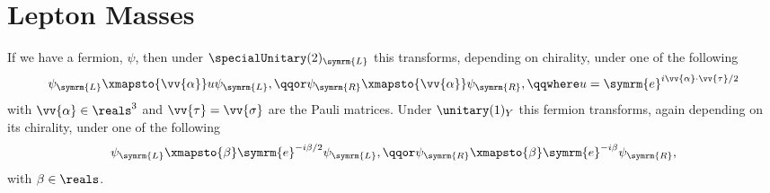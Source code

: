 \documentclass[fleqn]{NotesClass}
\newcommand{\e}{\symrm{e}}
\newcommand{\Left}{\symrm{L}}
\newcommand{\Right}{\symrm{R}}
\begin{document}
    \section{Lepton Masses}
    If we have a fermion, \(\psi\), then under \(\specialUnitary(2)_{\Left}\) this transforms, depending on chirality, under one of the following
    \begin{equation}
        \psi_{\Left} \xmapsto{\vv{\alpha}} u\psi_{\Left}, \qqor \psi_{\Right} \xmapsto{\vv{\alpha}} \psi_{\Right}, \qqwhere u = \e^{i\vv{\alpha} \cdot \vv{\tau} / 2}
    \end{equation}	
    with \(\vv{\alpha} \in \reals^3\) and \(\vv{\tau} = \vv{\sigma}\) are the Pauli matrices.
    Under \(\unitary(1)_Y\) this fermion transforms, again depending on its chirality, under one of the following
    \begin{equation}
        \psi_{\Left} \xmapsto{\beta} \e^{-i\beta/2}\psi_{\Left}, \qqor \psi_{\Right} \xmapsto{\beta} \e^{-i\beta} \psi_{\Right},
    \end{equation}
    with \(\beta \in \reals\).
    
\end{document}
